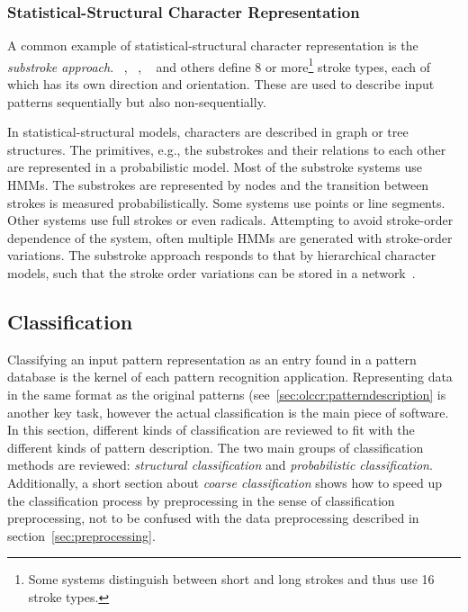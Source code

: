 \subsubsection{Statistical-Structural Character Representation}
\label{sec:olccr:statistical-structuralcharacterrepresentation}

A common example of statistical-structural character representation is the 
\emph{substroke approach}. ~\citeyear{Nakai2001}, 
~\citeyear{Shimodaira2003},
~\citeyear{Okumura2005} and others define 8 or more\footnote{Some systems 
distinguish between short and long strokes and thus use 16 stroke types.} stroke 
types, each of which has its own direction and orientation. These are used to
describe input patterns sequentially but also non-sequentially.

In statistical-structural models, characters are described in graph or tree 
structures. The primitives, e.g., the substrokes and their relations to each other
are represented in a probabilistic model. 
Most of the substroke systems use HMMs. The substrokes are represented by nodes
and the transition between strokes is measured probabilistically. Some systems
use points or line segments. Other systems use full strokes or even radicals.
Attempting to avoid stroke-order dependence of the system, often multiple HMMs
are generated with stroke-order variations.
The substroke approach responds to that by hierarchical character models,
such that the stroke order variations can be stored in a 
network~.  

\subsection{Classification}
\label{sec:olccr:classification}


Classifying an input pattern representation as an entry found in a pattern 
database is the kernel of each pattern recognition application.
Representing data in the same format as the original patterns 
(see~\ref{sec:olccr:patterndescription} is another key task, however the actual
classification is the main piece of software.
In this section, different kinds of classification are reviewed to fit with
the different kinds of pattern description. The two main groups of 
classification methods are reviewed: \emph{structural classification} and 
\emph{probabilistic classification}.
Additionally, a short section about \emph{coarse classification} shows how to
speed up the classification process by preprocessing in the sense of 
classification preprocessing, not to be confused with the data preprocessing
described in section~\ref{sec:preprocessing}.

